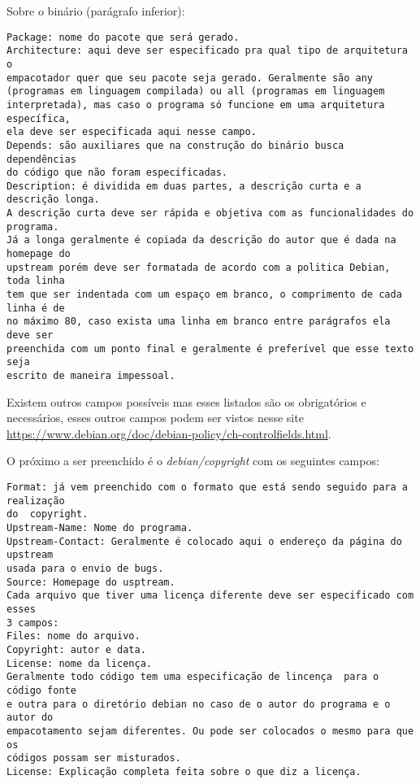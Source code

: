 Sobre o binário (parágrafo inferior):
\begin{verbatim}
Package: nome do pacote que será gerado.
Architecture: aqui deve ser especificado pra qual tipo de arquitetura o 
empacotador quer que seu pacote seja gerado. Geralmente são any 
(programas em linguagem compilada) ou all (programas em linguagem 
interpretada), mas caso o programa só funcione em uma arquitetura específica,
ela deve ser especificada aqui nesse campo.
Depends: são auxiliares que na construção do binário busca dependências
do código que não foram especificadas. 
Description: é dividida em duas partes, a descrição curta e a descrição longa.
A descrição curta deve ser rápida e objetiva com as funcionalidades do programa.
Já a longa geralmente é copiada da descrição do autor que é dada na homepage do
upstream porém deve ser formatada de acordo com a politica Debian, toda linha 
tem que ser indentada com um espaço em branco, o comprimento de cada linha é de
no máximo 80, caso exista uma linha em branco entre parágrafos ela deve ser
preenchida com um ponto final e geralmente é preferível que esse texto seja
escrito de maneira impessoal.
\end{verbatim}

Existem outros campos possíveis mas esses listados são os obrigatórios e necessários, esses outros campos podem ser vistos nesse site \url{https://www.debian.org/doc/debian-policy/ch-controlfields.html}.

O próximo a ser preenchido é o \textit{debian/copyright} com os seguintes campos:
\begin{verbatim}
Format: já vem preenchido com o formato que está sendo seguido para a realização
do  copyright.
Upstream-Name: Nome do programa.
Upstream-Contact: Geralmente é colocado aqui o endereço da página do upstream
usada para o envio de bugs.
Source: Homepage do usptream.
Cada arquivo que tiver uma licença diferente deve ser especificado com esses
3 campos:
Files: nome do arquivo.
Copyright: autor e data.
License: nome da licença.
Geralmente todo código tem uma especificação de lincença  para o código fonte
e outra para o diretório debian no caso de o autor do programa e o autor do
empacotamento sejam diferentes. Ou pode ser colocados o mesmo para que os 
códigos possam ser misturados.
License: Explicação completa feita sobre o que diz a licença. 
\end{verbatim}

